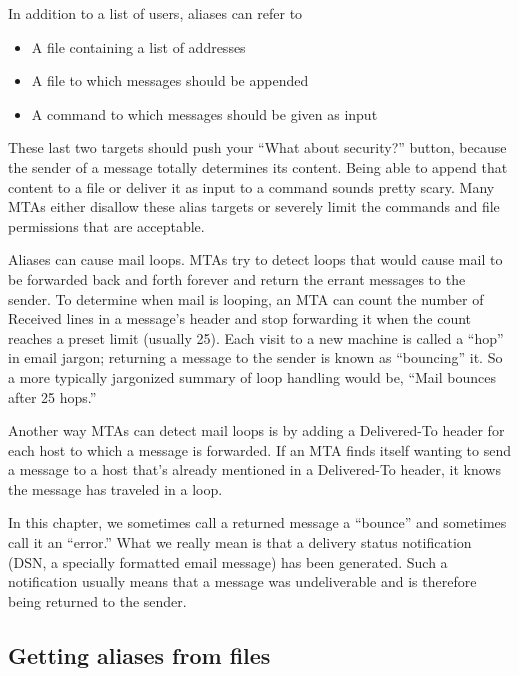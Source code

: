 In addition to a list of users, aliases can refer to

\begin{itemize}
\tightlist
\item
  A file containing a list of addresses
\item
  A file to which messages should be appended
\item
  A command to which messages should be given as input
\end{itemize}

These last two targets should push your ``What about security?'' button,
because the sender of a message totally determines its content. Being
able to append that content to a file or deliver it as input to a
command sounds pretty scary. Many MTAs either disallow these alias
targets or severely limit the commands and file permissions that are
acceptable.

Aliases can cause
\protect\hypertarget{part0026_split_018.htmlux5cux23_idIndexMarker2475}{}{}mail
loops. MTAs try to detect loops that would cause mail to be forwarded
back and forth forever and return the errant messages to the sender. To
determine when mail is looping, an MTA can count the number of Received
lines in a message's header and stop forwarding it when the count
reaches a preset limit (usually 25). Each visit to a new machine is
called a ``hop'' in email jargon; returning a message to the sender is
known as ``bouncing'' it. So a more typically jargonized
\protect\hypertarget{part0026_split_018.htmlux5cux23_idIndexMarker2476}{}{}summary
of loop handling would be, ``Mail bounces after 25 hops.''

Another way MTAs can detect mail loops is by adding a Delivered-To
header for each host to which a message is forwarded. If an MTA finds
itself wanting to send a message to a host that's already mentioned in a
Delivered-To header, it knows the message has traveled in a loop.

In this chapter, we sometimes call a returned message a ``bounce'' and
sometimes call it an ``error.'' What we really mean is that a delivery
status notification (DSN, a specially formatted email message) has been
generated. Such a notification usually means that a message was
undeliverable and is therefore being returned to the sender.

\protect\hypertarget{part0026_split_019.html}{}{}

\hypertarget{part0026_split_019.htmlux5cux23_idContainer1247}{}
\hypertarget{part0026_split_019.htmlux5cux23calibre_pb_18}{%
\subsection[Getting aliases from
files]{\texorpdfstring{\protect\hypertarget{part0026_split_019.htmlux5cux23_idTextAnchor1032}{}{}Getting
aliases from
files}{Getting aliases from files}}\label{part0026_split_019.htmlux5cux23calibre_pb_18}}

